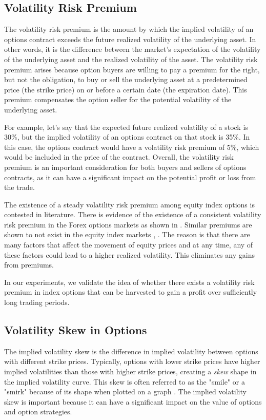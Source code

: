 \documentclass[10pt]{article}
\theoremstyle{definition}
\begin{document}
\subsection{Volatility Risk Premium}
The volatility risk premium is the amount by which the implied volatility of an options contract exceeds the future realized volatility of the underlying asset. In other words, it is the difference between the market's expectation of the volatility of the underlying asset and the realized volatility of the asset. The volatility risk premium arises because option buyers are willing to pay a premium for the right, but not the obligation, to buy or sell the underlying asset at a predetermined price (the strike price) on or before a certain date (the expiration date). This premium compensates the option seller for the potential volatility of the underlying asset.

For example, let's say that the expected future realized volatility of a stock is 30\%, but the implied volatility of an options contract on that stock is 35\%. In this case, the options contract would have a volatility risk premium of 5\%, which would be included in the price of the contract. Overall, the volatility risk premium is an important consideration for both buyers and sellers of options contracts, as it can have a significant impact on the potential profit or loss from the trade.

The existence of a steady volatility risk premium among equity index options is contested in literature. There is evidence of the existence of a consistent volatility risk premium in the Forex options markets as shown in \citep{dierckx_trading_2022, BhatRupeeDollar}. Similar premiums are shown to not exist in the equity index markets \citep{bondarenko2016analysis}, \citep{schulte2015performance} \citep{dapena2015index}. The reason is that there are many factors that affect the movement of equity prices and at any time, any of these factors could lead to a higher realized volatility. This eliminates any gains from premiums.

In our experiments, we validate the idea of whether there exists a volatility risk premium in index options that can be harvested to gain a profit over sufficiently long trading periods.

\subsection{Volatility Skew in Options}\label{volskew}
The implied volatility skew is the difference in implied volatility between options with different strike prices. Typically, options with lower strike prices have higher implied volatilities than those with higher strike prices, creating a \textit{skew} shape in the implied volatility curve. This skew is often referred to as the "smile" or a "smirk" because of its shape when plotted on a graph \citep{IVSmirk}. The implied volatility skew is important because it can have a significant impact on the value of options and option strategies.
\end{document}
